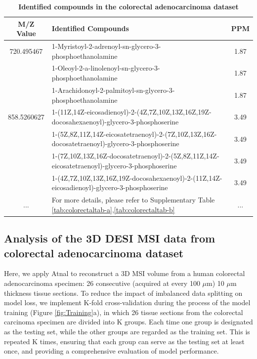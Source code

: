 \documentclass{WileyMSP-template}
\begin{document}
\begin{table}
  \centering
  \caption{\textbf{Identified compounds in the colorectal adenocarcinoma dataset}}
  \label{tbl:Compounds}
  \begin{tabular}{|c|p{15cm}|c|}
  \hline
  \textbf{M/Z Value} & \textbf{Identified Compounds}& \textbf{PPM} \\
  \hline
  720.495467
  &1-Myristoyl-2-adrenoyl-sn-glycero-3-phosphoethanolamine &1.87\\
  & 1-Oleoyl-2-a-linolenoyl-sn-glycero-3-phosphoethanolamine &1.87\\
  & 1-Arachidonoyl-2-palmitoyl-sn-glycero-3-phosphoethanolamine &1.87\\
  \hline
  858.5260627 
    & 1-(11Z,14Z-eicosadienoyl)-2-(4Z,7Z,10Z,13Z,16Z,19Z-docosahexaenoyl)-glycero-3-phosphoserine &3.49\\
   & 1-(5Z,8Z,11Z,14Z-eicosatetraenoyl)-2-(7Z,10Z,13Z,16Z-docosatetraenoyl)-glycero-3-phosphoserine &3.49\\
   & 1-(7Z,10Z,13Z,16Z-docosatetraenoyl)-2-(5Z,8Z,11Z,14Z-eicosatetraenoyl)-glycero-3-phosphoserine &3.49\\
   & 1-(4Z,7Z,10Z,13Z,16Z,19Z-docosahexaenoyl)-2-(11Z,14Z-eicosadienoyl)-glycero-3-phosphoserine &3.49\\
  \hline 
  ...& For more details, please refer to Supplementary Table \ref{tab:colorectaltab-a},\ref{tab:colorectaltab-b} &...\\
  \hline
  \end{tabular}
\end{table}

\subsection{Analysis of the 3D DESI MSI data from colorectal adenocarcinoma dataset}
Here, we apply Atnal to reconstruct a 3D MSI volume from a human colorectal 
adenocarcinoma specimen: 26 consecutive 
(acquired at every 100 $\mu$m) 10 $\mu$m 
thickness tissue sections. 
To reduce the impact of imbalanced data splitting on model loss, 
we implement K-fold cross-validation during the process of the model 
training (Figure \ref{fig:Training}a), in which 26 tissue sections 
from the colorectal 
carcinoma specimen are divided into K groups. 
Each time one group is designated as the testing set, while the other 
groups are regarded as the training set. This is repeated K times, 
ensuring that each group can serve as the testing set at least once, and providing a 
comprehensive evaluation of model performance. 
\end{document}
